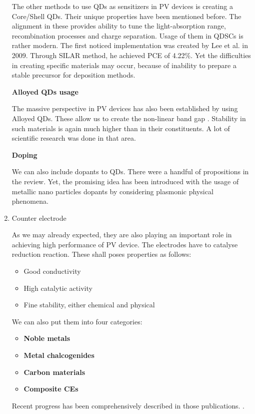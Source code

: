 \begin{enumerate}
The other methods to use QDs as sensitizers in PV devices is creating a
Core/Shell QDs. Their unique properties have been mentioned before. The
alignment in these provides ability to tune the light-absorption range,
recombination processes and charge separation. Usage of them in QDSCs is
rather modern. The first noticed implementation was created by Lee et
al. in 2009. Through SILAR method, he achieved PCE of 4.22\%. \cite{Lee2009} Yet the difficulties in creating specific materials may occur, because of inability to prepare a stable precursor for deposition methods. 

\textbf{Alloyed QDs usage}

The massive perspective in PV devices has also been established by using Alloyed QDs. These allow us to create the non-linear band gap \cite{Regulacio2010} . Stability in such materials is again much higher than in their constituents. A lot of scientific research was done in that area.

\textbf{Doping}

We can also include dopants to QDs. There were a handful of propositions in the \cite{HuashangRao2018} review. Yet, the promising idea has been introduced with the usage of metallic nano particles dopants by considering plasmonic physical phenomena.\cite{Kubo2015} \cite{YongjieWang2017}

\item Counter electrode

As we may already expected, they are also playing an important role in
achieving high performance of PV device. The electrodes have to catalyse
reduction reaction. These shall poses properties as follows:

\begin{itemize}
\item
  Good conductivity
\item
  High catalytic activity
\item
  Fine stability, either chemical and physical
\end{itemize}

We can also put them into four categories:

\begin{itemize}
\item
  \textbf{Noble metals}
\item
  \textbf{Metal chalcogenides}
\item
  \textbf{Carbon materials}
\item
  \textbf{Composite CEs}
\end{itemize}

Recent progress has been comprehensively described in those publications.
\cite{Yang2017} \cite{HuashangRao2018} .




\end{enumerate}
